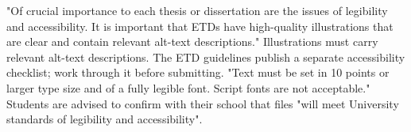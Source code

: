 %



%

\thesisrequiretagging
{}
	{"Of crucial importance to each thesis or dissertation are the issues of
	 legibility and accessibility. It is important that ETDs have high-quality
	 illustrations that are clear and contain relevant alt-text descriptions."}
	{Illustrations must carry relevant alt-text descriptions.}
	{The ETD guidelines publish a separate accessibility checklist; work through
	 it before submitting.}
	{"Text must be set in 10 points or larger type size and of a fully legible
	 font. Script fonts are not acceptable." Students are advised to confirm
	 with their school that files "will meet University standards of legibility
	 and accessibility".}
